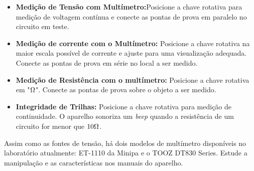 \begin{itemize}
    \item \textbf{Medição de Tensão com Multímetro:}Posicione a chave rotativa para medição de voltagem contínua e conecte as pontas de prova em paralelo no circuito em teste.
    

    \item \textbf{Medição de corrente com o Multímetro:} Posicione a chave rotativa na maior escala possível de corrente e ajuste para uma visualização adequada. Conecte as pontas de prova em série no local a ser medido.
    
    
    \item \textbf{Medição de Resistência com o multímetro:} Posicione a chave rotativa em "$\ohm$". Conecte as pontas de prova sobre o objeto a ser medido.
    

    \item \textbf{Integridade de Trilhas:} Posicione a chave rotativa para medição de continuidade. O aparelho sonoriza um \textit{beep} quando a resistência de um circuito for menor que $10\ohm$.
    
\end{itemize}

Assim como as fontes de tensão, há dois modelos de multímetro disponíveis no laboratório atualmente: ET-1110 da Minipa e o TOOZ DT830 Series. Estude a manipulação e as características nos manuais do aparelho.



